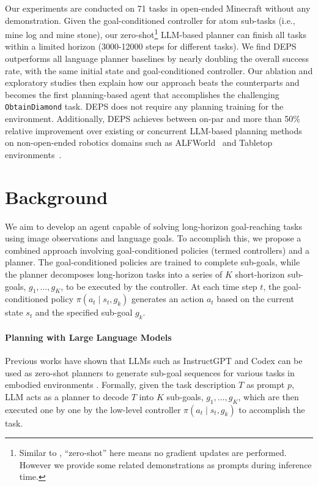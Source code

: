 \documentclass{article}
\begin{document}
Our experiments are conducted on 71 tasks in open-ended Minecraft without any demonstration. Given the goal-conditioned controller for atom sub-tasks (i.e., mine log and mine stone), our zero-shot\footnote{Similar to \cite{gpt3,huang2022language}, ``zero-shot'' here means no gradient updates are performed. However we provide some related demonstrations as prompts during inference time.\vspace{-10pt}} LLM-based planner can finish all tasks within a limited horizon (3000-12000 steps for different tasks). We find DEPS outperforms all language planner baselines by nearly doubling the overall success rate, with the same initial state and goal-conditioned controller. 
Our ablation and exploratory studies then explain how our approach beats the counterparts and becomes the first planning-based agent that accomplishes the challenging \texttt{ObtainDiamond} task. DEPS does not require any planning training for the environment. Additionally, DEPS achieves between on-par and more than 50\% relative improvement over existing or concurrent LLM-based planning methods on non-open-ended
 robotics domains such as ALFWorld~\cite{alfworld} and Tabletop environments~\cite{clipport}.


\section{Background}\label{sec:background}

We aim to develop an agent capable of solving long-horizon goal-reaching tasks using image observations and language goals. To accomplish this, we propose a combined approach involving goal-conditioned policies (termed controllers) and a planner. The goal-conditioned policies are trained to complete sub-goals, while the planner decomposes long-horizon tasks into a series of $K$ short-horizon sub-goals, $g_1, \ldots, g_K$, to be executed by the controller. At each time step $t$, the goal-conditioned policy $\pi(a_t\mid s_t,g_k)$ generates an action $a_t$ based on the current state $s_t$ and the specified sub-goal $g_k$.


\paragraph{Planning with Large Language Models} Previous works have shown that LLMs such as InstructGPT \cite{instructGPT} and Codex \cite{codex} can be used as zero-shot planners to generate sub-goal sequences for various tasks in embodied environments \cite{huang2022language,progprompt}.
Formally, given the task description $T$ as prompt $p$, LLM acts as a planner to decode $T$ into $K$ sub-goals, $g_1, \ldots, g_K$, which are then executed one by one by the low-level controller $\pi(a_t \mid s_t, g_k)$ to accomplish the task.
\end{document}
